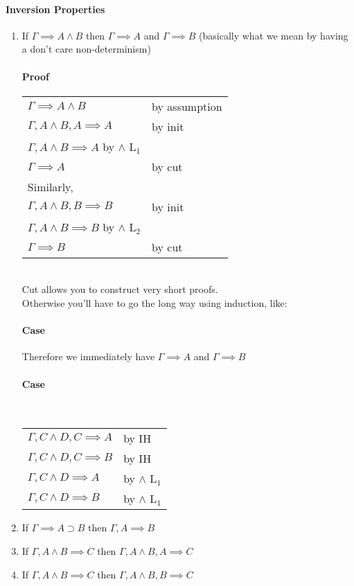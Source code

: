 \documentclass[12 pt]{article}
\begin{document}
	\paragraph{Inversion Properties}
	\begin{enumerate}
		\item If $\Gamma \implies A \land B$ then $\Gamma \implies A$
		      and $\Gamma \implies B$ (basically what we mean by having a
		      don't care non-determinism)
		      \paragraph{Proof}

		      \begin{tabular}[t]{l l}
			      $\Gamma \implies A \land B$ & by assumption
			      \\ $\Gamma, A \land B, A \implies A$ & by init
			      \\ $\Gamma, A \land B \implies A$ by $\land$ L$_1$
			      \\ $\Gamma \implies A$ & by cut
			      \\ Similarly,
			      \\ $\Gamma, A \land B, B \implies B$ & by init
			      \\ $\Gamma, A \land B \implies B$ by $\land$ L$_2$
			      \\ $\Gamma \implies B$ & by cut
		      \end{tabular}
		      \\ Cut allows you to construct very short proofs.
		      \\ Otherwise you'll have to go the long way using induction,
		      like:
		      \paragraph{Case} \DP
		      Therefore we immediately have $\Gamma \implies A$ and $\Gamma
			      \implies B$
		      \paragraph{Case} \noLine{}\DP
		      \\
		      \begin{tabular}{l l}
			      $\Gamma, C \land D, C \implies A$ & by IH
			      \\ $\Gamma, C \land D, C \implies B$ & by IH
			      \\ $\Gamma, C \land D \implies A$ & by $\land$ L$_1$
			      \\ $\Gamma, C \land D \implies B$ & by $\land$ L$_1$
		      \end{tabular}
		\item If $\Gamma \implies A \supset B$ then $\Gamma, A \implies
			      B$
		\item If $\Gamma, A \land B \implies C$ then $\Gamma, A \land
			      B, A \implies C$
		\item If $\Gamma, A \land B \implies C$ then $\Gamma, A \land
			      B, B \implies C$


\end{enumerate}
\end{document}
